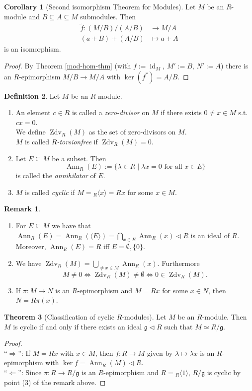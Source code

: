 \documentclass[12pt,a4paper]{report}
\theoremstyle{definition}
\newtheorem{theorem}{Theorem}[chapter] %
\newtheorem{corollary}[theorem]{Corollary} %
\newtheorem{defn}[theorem]{Definition}
\newtheorem*{remark}{Remark}
\theoremstyle{num.custom-title}
\DeclareMathOperator{\id}{id}
\DeclareMathOperator{\Zdv}{Zdv}
\DeclareMathOperator{\Ann}{Ann}
\DeclareMathOperator{\imp}{\Rightarrow}
\DeclareMathOperator{\pmi}{\Leftarrow}
\DeclareMathOperator{\sse}{\subseteq}
\newcommand{\g}{\mathfrak{g}}
\renewcommand{\iff}{\Leftrightarrow}
\begin{document}
\begin{corollary}[Second isomorphism Theorem for Modules]
Let $M$ be an $R$-module and $B \sse A \sse M$ submodules. Then 
\begin{align*}
\tilde{f} \colon (M/B)/(A/B) &\to M/A \\
(a+B)+(A/B) &\mapsto a+A
\end{align*}
is an isomorphism.
\begin{proof}
By Theorem \ref{mod-hom-thm} (with $f:=\id_M$, $M':=B$, $N':=A$) there is an $R$-epimorphism $M/B \to M/A$ with $\ker(f^*) = A/B$.
\end{proof}
\end{corollary}

\begin{defn}
Let $M$ be an $R$-module.
\begin{enumerate}
\item An element $c \in R$ is called a \emph{zero-divisor} on $M$ if there exists $0 \neq x \in M$ s.t. $cx=0$.\\
We define $\Zdv_R(M)$ as the set of zero-divisors on $M$.\\
$M$ is called \emph{$R$-torsionfree} if $\Zdv_R(M)=0$.
\item Let $E \sse M$ be a subset. Then
\[
\Ann_R(E) := \{\lambda \in R \mid \lambda x = 0 \text{ for all } x \in E\}
\]
is called the \emph{annihilator} of $E$.
\item $M$ is called \emph{cyclic} if $M={}_R \langle x \rangle = Rx$ for some $x \in M$.
\end{enumerate}
\end{defn}

\begin{remark}\ 
\begin{enumerate}
\item For $E \sse M$ we have that $\Ann_R(E) = \Ann_R(\langle E \rangle) = \bigcap_{x \in E} \Ann_R(x) \lhd R$ is an ideal of $R$. Moreover, $\Ann_R(E)=R$ iff $E = \emptyset,\{0\}$.
\item We have $\Zdv_R(M) = \bigcup_{\neq x \in M} \Ann_R(x)$. Furthermore
\[
M \neq 0 \iff \Zdv_R(M) \neq \emptyset \iff 0 \in \Zdv_R(M).
\]
\item If $\pi \colon M \to N$ is an $R$-epimorphism and $M=Rx$ for some $x \in N$, then $N=R\pi(x)$.
\end{enumerate}
\end{remark}

\begin{theorem}[Classification of cyclic $R$-modules]
Let $M$ be an $R$-module. Then $M$ is cyclic if and only if there exists an ideal $\g \lhd R$ such that $M \simeq R/\g$.
\begin{proof}\ \\
``$\imp$'': If $M=Rx$ with $x \in M$, then $f: R \to M$ given by $\lambda \mapsto \lambda x$ is an $R$-epimorphism with $\ker f = \Ann_R(M) \lhd R$.\\
``$\pmi$'': Since $\pi : R \to R/\g$ is an $R$-epimorphism and $R={}_R\langle 1 \rangle$, $R/\g$ is cyclic by point (3) of the remark above.
\end{proof}
\end{theorem}
\end{document}
